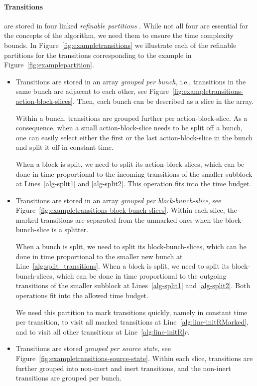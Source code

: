 \documentclass[a4paper,10pt]{article}
\theoremstyle{definition}
\theoremstyle{plain}
\begin{document}
\paragraph{Transitions}
are stored in four linked \emph{refinable partitions} \cite{ValmariL08}.
While not all four are essential for the concepts of the algorithm, we need them to ensure the time complexity bounds.
In Figure~\ref{fig:exampletransitions} we illustrate each of the refinable partitions for the transitions corresponding to the example in Figure~\ref{fig:examplepartition}.

\begin{itemize}
\item	Transitions are stored in an array \emph{grouped per bunch,}
	i.e., transitions in the same bunch are adjacent to each other, see Figure~\ref{fig:exampletransitions-action-block-slices}.
	Then, each bunch can be described as a slice in the array.

	Within a bunch, transitions are grouped further per action-block-slice.
	As a consequence, when a small action-block-slice needs to be split off a bunch,
	one can easily select either the first or the last action-block-slice in the bunch
	and split it off in constant time.

	When a block is split, we need to split its action-block-slices,
	which can be done in time proportional to the incoming transitions of the smaller subblock at Lines~\ref{alg-split1} and \ref{alg-split2}.
	This operation fits into the time budget.
\item	Transitions are stored in an array \emph{grouped per block-bunch-slice,} see Figure~\ref{fig:exampletransitions-block-bunch-slices}.
	Within each slice, the marked transitions are separated from the unmarked ones
	when the block-bunch-slice is a splitter.

	When a bunch is split, we need to split its block-bunch-slices,
	which can be done in time proportional to the smaller new bunch at Line~\ref{alg:split_transitions}.
	When a block is split, we need to split its block-bunch-slices,
	which can be done in time proportional to the outgoing transitions of the smaller subblock at Lines~\ref{alg-split1} and \ref{alg-split2}.
	Both operations fit into the allowed time budget.

	We need this partition to mark transitions quickly, namely in constant time per transition,
	to visit all marked transitions at Line~\ref{alg:line-initRMarked},
	and to visit all other transitions at Line~\ref{alg:line-initR}$r$.
\item	Transitions are stored \emph{grouped per source state,} see Figure~\ref{fig:exampletransitions-source-state}.
	Within each slice, transitions are further grouped into non-inert and inert transitions,
	and the non-inert transitions are grouped per bunch.


\end{itemize}
\end{document}
